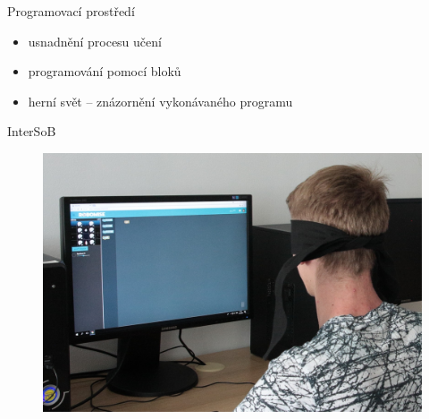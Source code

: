 \documentclass[
]{beamer}
\begin{document}
\begin{frame}{Programovací prostředí}
\begin{itemize}
\item usnadnění procesu učení
\item programování pomocí bloků
\item herní svět -- znázornění vykonávaného programu
\end{itemize}
\end{frame}

\begin{frame}{InterSoB}
\begin{figure}
\includegraphics[width=\textwidth,height=.75\textheight,keepaspectratio]{../img/intersob}
\end{figure}
\end{frame}
\end{document}
